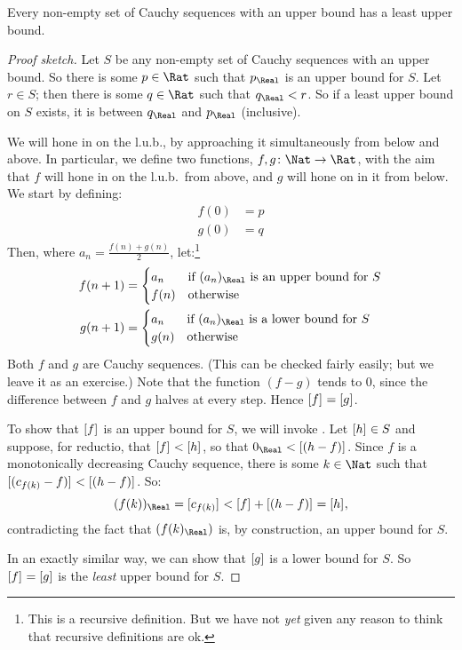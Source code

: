 \documentclass[../../../include/open-logic-section]{subfiles}
\begin{document}
\begin{thm}
Every non-empty set of Cauchy sequences with an upper bound has a
least upper bound.
\end{thm}

\begin{proof}[Proof sketch] Let $S$ be any non-empty set of Cauchy
sequences with an upper bound. So there is some $p \in \Rat$ such that
$p_{\Real}$ is an upper bound for $S$. Let $r \in S$; then there is
some $q \in \Rat$ such that $q_{\Real} < r$. So if a least upper bound
on $S$ exists, it is between $q_\Real$ and $p_\Real$ (inclusive). 

We will hone in on the l.u.b., by approaching it simultaneously from
below and above. In particular, we define two functions, $f, g \colon
\Nat \to \Rat$, with the aim that $f$ will hone in on the l.u.b.\ from
above, and $g$ will hone on in it from below. We start by defining:
\begin{align*}
	f(0) &= p \\
	g(0) &= q
\end{align*}
Then, where $a_n = \frac{f(n) + g(n)}{2}$, let:\footnote{This is a
recursive definition. But we have not \emph{yet} given any reason to
think that recursive definitions are ok.}
\begin{align*}
	f(n+1) &=
	\begin{cases}
		a_n &\text{if $(a_n)_\Real$ is an upper bound for }S\\
		f(n)&\text{otherwise}
	\end{cases}\\
	g(n+1) &=
	\begin{cases}
		a_n &\text{if $(a_n)_\Real$ is a lower bound for }S\\
	 	g(n) &\text{otherwise}
	\end{cases}
\end{align*}
Both $f$ and $g$ are Cauchy sequences. (This can be checked fairly
easily; but we leave it as an exercise.) Note that the function $(f-g)$
tends to $0$, since the difference between $f$ and $g$ halves at every
step. Hence $[f]_{} = [g]_{}$. 

To show that  $[f]_{}$ is an upper bound for $S$, we will
invoke . Let $[h]_{} \in S$ and
suppose, for reductio, that $[f]_{} < [h]_{}$, so that
$0_\Real < \equivrep{(h-f)}{}$. Since $f$ is a monotonically
decreasing Cauchy sequence, there is some $k \in \Nat$ such that
$[(c_{f(k)} - f)]_{} < [(h-f)]_{}$. So:
\[
(f(k))_\Real  = \equivrep{c_{f(k)}}{} < \equivrep{f}{} + \equivrep{(h-f)}{} = \equivrep{h}{},
\]
contradicting the fact that $(f(k)_\Real)$ is, by construction, an
upper bound for $S$.

In an exactly similar way, we can show that $[g]_{}$ is a
lower bound for $S$. So $[f]_{} = [g]_{}$ is the
\emph{least} upper bound for $S$.
\end{proof}
\end{document}
